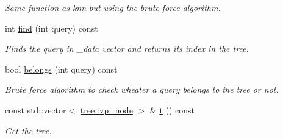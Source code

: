 \begin{DoxyCompactItemize}
\begin{DoxyCompactList}\small\item\em Same function as knn but using the brute force algorithm. \end{DoxyCompactList}\item 
\hypertarget{classtree_1_1cpu_1_1vp__tree_a705a05444e892308fa7156968a29456d}{}int \hyperlink{classtree_1_1cpu_1_1vp__tree_a705a05444e892308fa7156968a29456d}{find} (int query) const \label{classtree_1_1cpu_1_1vp__tree_a705a05444e892308fa7156968a29456d}

\begin{DoxyCompactList}\small\item\em Finds the query in \+\_\+data vector and returns its index in the tree. \end{DoxyCompactList}\item 
\hypertarget{classtree_1_1cpu_1_1vp__tree_a30b6f89d268aae73aeb8a3125eeb631d}{}bool \hyperlink{classtree_1_1cpu_1_1vp__tree_a30b6f89d268aae73aeb8a3125eeb631d}{belongs} (int query) const \label{classtree_1_1cpu_1_1vp__tree_a30b6f89d268aae73aeb8a3125eeb631d}

\begin{DoxyCompactList}\small\item\em Brute force algorithm to check wheater a query belongs to the tree or not. \end{DoxyCompactList}\item 
\hypertarget{classtree_1_1cpu_1_1vp__tree_a8bcaaceaf06f2970267ae5244668f272}{}const std\+::vector$<$ \hyperlink{structtree_1_1vp__node__t}{tree\+::vp\+\_\+node} $>$ \& \hyperlink{classtree_1_1cpu_1_1vp__tree_a8bcaaceaf06f2970267ae5244668f272}{t} () const \label{classtree_1_1cpu_1_1vp__tree_a8bcaaceaf06f2970267ae5244668f272}

\begin{DoxyCompactList}\small\item\em Get the tree. \end{DoxyCompactList}\end{DoxyCompactItemize}
